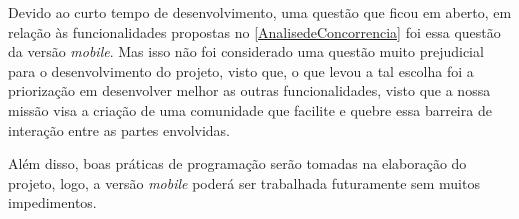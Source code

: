 Devido ao curto tempo de desenvolvimento, uma questão que ficou em aberto, em relação às funcionalidades propostas no \autoref{AnalisedeConcorrencia} foi essa questão da versão \textit{mobile}. Mas isso não foi considerado uma questão muito prejudicial para o desenvolvimento do projeto, visto que, o que levou a tal escolha foi a priorização em desenvolver melhor as outras funcionalidades, visto que a nossa missão visa a criação de uma comunidade que facilite e quebre essa barreira de interação entre as partes envolvidas.

Além disso, boas práticas de programação serão tomadas na elaboração do projeto, logo, a versão \textit{mobile} poderá ser trabalhada futuramente sem muitos impedimentos.
